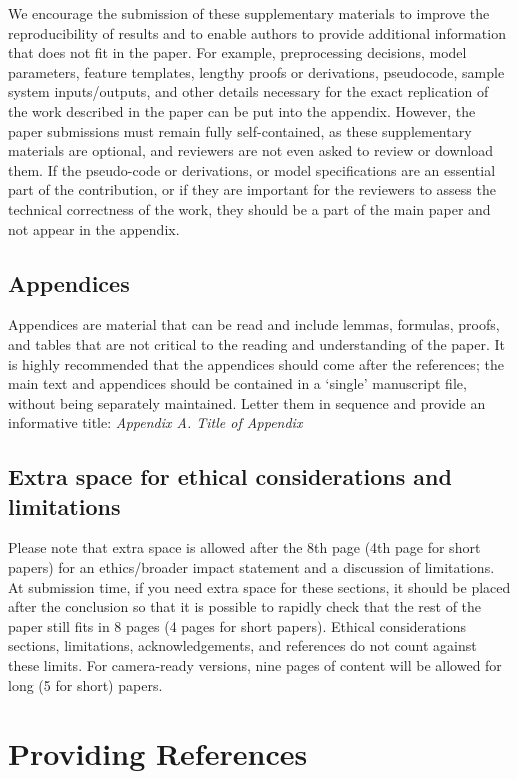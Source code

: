 \documentclass[10pt, a4paper]{article}
\begin{document}
We encourage the submission of these supplementary materials to improve the reproducibility of results and to enable authors to provide additional information that does not fit in the paper. For example, preprocessing decisions, model parameters, feature templates, lengthy proofs or derivations, pseudocode, sample system inputs/outputs, and other details necessary for the exact replication of the work described in the paper can be put into the appendix. However, the paper submissions must remain fully self-contained, as these supplementary materials are optional, and reviewers are not even asked to review or download them. If the pseudo-code or derivations, or model specifications are an essential part of the contribution, or if they are important for the reviewers to assess the technical correctness of the work, they should be a part of the main paper and not appear in the appendix.

\subsection{Appendices}

Appendices are material that can be read and include lemmas, formulas, proofs, and tables that are not critical to the reading and understanding of the paper. It is  highly recommended that the appendices should come after the references; the main text and appendices should be contained in a `single' manuscript file, without being separately maintained. Letter them in sequence and provide an informative title: \textit{Appendix A. Title of Appendix}


\subsection{Extra space for ethical considerations and limitations}

Please note that extra space is allowed after the 8th page (4th page for short papers) for an ethics/broader impact statement and a discussion of limitations. At submission time, if you need extra space for these sections, it should be placed after the conclusion so that it is possible to rapidly check that the rest of the paper still fits in 8 pages (4 pages for short papers). Ethical considerations sections, limitations, acknowledgements, and references do not count against these limits. For camera-ready versions, nine pages of content will be allowed for long (5 for short) papers.

\section{Providing References}
\end{document}
